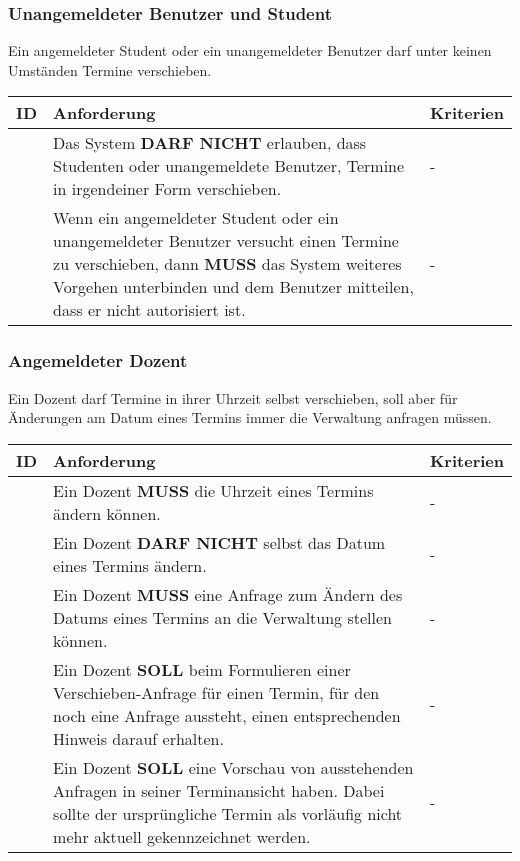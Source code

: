 \subsubsection{Unangemeldeter Benutzer und Student}
Ein angemeldeter Student oder ein unangemeldeter Benutzer darf unter keinen Umständen Termine verschieben.

\vspace{12pt}

\begin{tabular} {|p{}|p{}|p{}|}
	\hline
	ID & Anforderung & Kriterien \\
	\hline
	\printfreqnr
	& Das System \textbf{DARF NICHT} erlauben, dass Studenten oder unangemeldete Benutzer, Termine in irgendeiner Form verschieben. 
	& - \\
	\hline
	\printfreqnr
	& Wenn ein angemeldeter Student oder ein unangemeldeter Benutzer versucht einen Termine zu verschieben, dann \textbf{MUSS} das System weiteres Vorgehen unterbinden und dem Benutzer mitteilen, dass er nicht autorisiert ist.
	& - \\ 
	\hline
\end{tabular}

\vspace{12pt}

\subsubsection{Angemeldeter Dozent}
Ein Dozent darf Termine in ihrer Uhrzeit selbst verschieben, soll aber für Änderungen am Datum eines Termins immer die Verwaltung anfragen müssen.

\vspace{12pt}

\begin{tabular} {|p{}|p{}|p{}|}
	\hline
	ID & Anforderung & Kriterien \\
	\hline
	\printfreqnr
	& Ein Dozent \textbf{MUSS} die Uhrzeit eines Termins ändern können.
	& - \\
	\hline
	\printfreqnr
	& Ein Dozent \textbf{DARF NICHT} selbst das Datum eines Termins ändern.
	& - \\
	\hline
	\printfreqnr
	& Ein Dozent \textbf{MUSS} eine Anfrage zum Ändern des Datums eines Termins an die Verwaltung stellen können.
	& - \\
	\hline
	\printfreqnr
	& Ein Dozent \textbf{SOLL} beim Formulieren einer Verschieben-Anfrage für einen Termin, für den noch eine Anfrage aussteht, einen entsprechenden Hinweis darauf erhalten.
	& - \\
	\hline
	\printfreqnr
	& Ein Dozent \textbf{SOLL} eine Vorschau von ausstehenden Anfragen in seiner Terminansicht haben. Dabei sollte der ursprüngliche Termin als vorläufig nicht mehr aktuell gekennzeichnet werden.
	& - \\
	\hline
\end{tabular}

